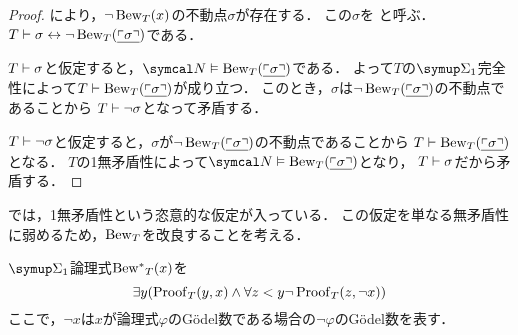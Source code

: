\begin{proof}
	により，\(\lnot \apply{\Bew_T}{x}\)の不動点\(\sigma\)が存在する．
	この\(\sigma\)を
	と呼ぶ．
	\(T \provable \sigma \formulaequiv \lnot \apply{\Bew_T}{\numeral{\GodelNumber{\sigma}}}\)である．

	\(T \vdash \sigma\)と仮定すると，\(\standardmodel \satisfy \apply{\Bew_T}{\numeral{\GodelNumber{\sigma}}}\)である．
	よって\(T\)の\(\SigmaFormula_1\)完全性によって\(T \provable \apply{\Bew_T}{\numeral{\GodelNumber{\sigma}}}\)が成り立つ．
	このとき，\(\sigma\)は\(\lnot \apply{\Bew_T}{\numeral{\GodelNumber{\sigma}}}\)の不動点であることから
	\(T \vdash \lnot \sigma\)となって矛盾する．

	\(T \vdash \lnot \sigma\)と仮定すると，\(\sigma\)が\(\lnot \apply{\Bew_T}{\numeral{\GodelNumber{\sigma}}}\)の不動点であることから
	\(T \provable \apply{\Bew_T}{\numeral{\GodelNumber{\sigma}}}\)となる．
	\(T\)の1無矛盾性によって\(\standardmodel \satisfy \apply{\Bew_T}{\numeral{\GodelNumber{\sigma}}}\)となり，
	\(T \vdash \sigma\)だから矛盾する．
\end{proof}

では，1無矛盾性という恣意的な仮定が入っている．
この仮定を単なる無矛盾性に弱めるため，\(\operatorname{Bew}_T\)を改良することを考える．

\begin{Def} \label{Def:Bewstar}
	\(\SigmaFormula_1\)論理式\(\apply{\Bewstar_T}{x}\)を
	\begin{equation}
		\exists y \paren{\apply{\ProofPredicate_T}{y, x} \land \forall z < y \lnot \apply{\ProofPredicate_T}{z, \lnot x}}
		\label{eq:Bewstar}
	\end{equation}
	ここで，\(\lnot x\)は\(x\)が論理式\(\varphi\)のGödel数である場合の\(\lnot \varphi\)のGödel数を表す．
\end{Def}


